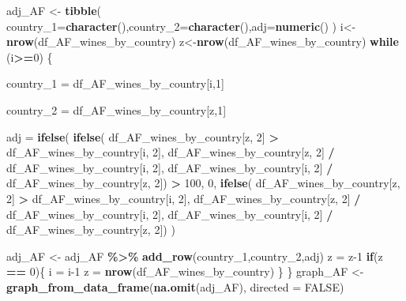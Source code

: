 \documentclass[
]{article}
\newenvironment{Shaded}{\begin{snugshade}}{\end{snugshade}}
\newcommand{\AttributeTok}[1]{\textcolor[rgb]{0.13,0.29,0.53}{#1}}
\newcommand{\ConstantTok}[1]{\textcolor[rgb]{0.56,0.35,0.01}{#1}}
\newcommand{\ControlFlowTok}[1]{\textcolor[rgb]{0.13,0.29,0.53}{\textbf{#1}}}
\newcommand{\DecValTok}[1]{\textcolor[rgb]{0.00,0.00,0.81}{#1}}
\newcommand{\FunctionTok}[1]{\textcolor[rgb]{0.13,0.29,0.53}{\textbf{#1}}}
\newcommand{\NormalTok}[1]{#1}
\newcommand{\OtherTok}[1]{\textcolor[rgb]{0.56,0.35,0.01}{#1}}
\newcommand{\SpecialCharTok}[1]{\textcolor[rgb]{0.81,0.36,0.00}{\textbf{#1}}}
\begin{document}
\begin{Shaded}
\begin{Highlighting}[]
\NormalTok{adj\_AF }\OtherTok{\textless{}{-}} \FunctionTok{tibble}\NormalTok{( }\AttributeTok{country\_1=}\FunctionTok{character}\NormalTok{(),}\AttributeTok{country\_2=}\FunctionTok{character}\NormalTok{(),}\AttributeTok{adj=}\FunctionTok{numeric}\NormalTok{()}
\NormalTok{)}
\NormalTok{i}\OtherTok{\textless{}{-}}\FunctionTok{nrow}\NormalTok{(df\_AF\_wines\_by\_country)}
\NormalTok{z}\OtherTok{\textless{}{-}}\FunctionTok{nrow}\NormalTok{(df\_AF\_wines\_by\_country)}
\ControlFlowTok{while}\NormalTok{ (i}\SpecialCharTok{\textgreater{}=}\DecValTok{0}\NormalTok{) \{}
  
  
\NormalTok{    country\_1 }\OtherTok{=}\NormalTok{ df\_AF\_wines\_by\_country[i,}\DecValTok{1}\NormalTok{]}
    
\NormalTok{    country\_2 }\OtherTok{=}\NormalTok{ df\_AF\_wines\_by\_country[z,}\DecValTok{1}\NormalTok{]}
    
\NormalTok{    adj }\OtherTok{=} 
      \FunctionTok{ifelse}\NormalTok{(      }
        \FunctionTok{ifelse}\NormalTok{(}
\NormalTok{          df\_AF\_wines\_by\_country[z, }\DecValTok{2}\NormalTok{] }\SpecialCharTok{\textgreater{}}\NormalTok{ df\_AF\_wines\_by\_country[i, }\DecValTok{2}\NormalTok{],}
\NormalTok{                 df\_AF\_wines\_by\_country[z, }\DecValTok{2}\NormalTok{] }\SpecialCharTok{/}\NormalTok{ df\_AF\_wines\_by\_country[i, }\DecValTok{2}\NormalTok{],}
\NormalTok{                 df\_AF\_wines\_by\_country[i, }\DecValTok{2}\NormalTok{] }\SpecialCharTok{/}\NormalTok{ df\_AF\_wines\_by\_country[z, }\DecValTok{2}\NormalTok{]) }\SpecialCharTok{\textgreater{}} \DecValTok{100}\NormalTok{,}
        \DecValTok{0}\NormalTok{, }
        \FunctionTok{ifelse}\NormalTok{(}
\NormalTok{          df\_AF\_wines\_by\_country[z, }\DecValTok{2}\NormalTok{] }\SpecialCharTok{\textgreater{}}\NormalTok{ df\_AF\_wines\_by\_country[i, }\DecValTok{2}\NormalTok{],}
\NormalTok{                 df\_AF\_wines\_by\_country[z, }\DecValTok{2}\NormalTok{] }\SpecialCharTok{/}\NormalTok{ df\_AF\_wines\_by\_country[i, }\DecValTok{2}\NormalTok{],}
\NormalTok{                 df\_AF\_wines\_by\_country[i, }\DecValTok{2}\NormalTok{] }\SpecialCharTok{/}\NormalTok{ df\_AF\_wines\_by\_country[z, }\DecValTok{2}\NormalTok{])}
\NormalTok{      )}
    
 

\NormalTok{adj\_AF }\OtherTok{\textless{}{-}}\NormalTok{ adj\_AF }\SpecialCharTok{\%\textgreater{}\%} \FunctionTok{add\_row}\NormalTok{(country\_1,country\_2,adj)}
\NormalTok{    z }\OtherTok{=}\NormalTok{ z}\DecValTok{{-}1}
  \ControlFlowTok{if}\NormalTok{(z }\SpecialCharTok{==} \DecValTok{0}\NormalTok{)\{}
\NormalTok{    i }\OtherTok{=}\NormalTok{ i}\DecValTok{{-}1}
\NormalTok{    z }\OtherTok{=} \FunctionTok{nrow}\NormalTok{(df\_AF\_wines\_by\_country)}
\NormalTok{  \}}
\NormalTok{\}}
\NormalTok{graph\_AF }\OtherTok{\textless{}{-}} \FunctionTok{graph\_from\_data\_frame}\NormalTok{(}\FunctionTok{na.omit}\NormalTok{(adj\_AF), }\AttributeTok{directed =} \ConstantTok{FALSE}\NormalTok{)}


\end{Highlighting}
\end{Shaded}
\end{document}

